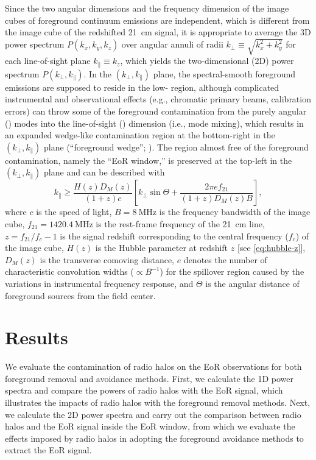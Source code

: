 \documentclass[twocolumn]{aastex62}
\newcommand{\klos}{\text{$k_{\parallel}$}}
\newcommand{\kperp}{\text{$k_{\bot}$}}
\begin{document}
Since the two angular dimensions and the frequency dimension of the image
cubes of foreground continuum emissions are independent, which is
different from the image cube of the redshifted 21~cm signal, it is
appropriate to average the 3D power spectrum $P(k_x, k_y, k_z)$
over angular annuli of radii $\kperp \equiv \sqrt{k_x^2 + k_y^2}$
for each line-of-sight plane $\klos \equiv k_z$, which yields the
two-dimensional (2D) power spectrum $P(\kperp, \klos)$.
In the $(\kperp, \klos)$ plane, the spectral-smooth foreground emissions
are supposed to reside in the low-\klos{} region, although complicated
instrumental and observational effects (e.g., chromatic primary beams,
calibration errors) can throw some of the foreground contamination from
the purely angular (\kperp) modes into the line-of-sight (\klos)
dimension (i.e., mode mixing), which results in an expanded wedge-like
contamination region at the bottom-right in the $(\kperp, \klos)$ plane
(\enquote{foreground wedge}; \citealt{datta2010,morales2012,liu2014}).
The region almost free of the foreground contamination, namely the
\enquote{EoR window,} is preserved at the top-left in the
$(\kperp, \klos)$ plane and can be described with \citep{thyagarajan2013}
\begin{equation}
  \label{eq:eor-window}
  \klos \geq \frac{H(z) D_{\!M}(z)}{(1+z) c} \left[
    \kperp \sin\Theta + \frac{2\pi e f_{21}}{(1+z) D_{\!M}(z) B} \right],
\end{equation}
where
$c$ is the speed of light,
$B = \SI{8}{\MHz}$ is the frequency bandwidth of the image cube,
$f_{21} = \SI{1420.4}{\MHz}$ is the rest-frame frequency of the 21~cm line,
$z = f_{21}/f_c - 1$ is the signal redshift corresponding to the central
frequency ($f_c$) of the image cube,
$H(z)$ is the Hubble parameter at redshift $z$ [see \autoref{eq:hubble-z}],
$D_{\!M}(z)$ is the transverse comoving distance,
$e$ denotes the number of characteristic convolution widths
($\propto B^{-1}$) for the spillover region caused by the variations in
instrumental frequency response,
and $\Theta$ is the angular distance of foreground sources from the
field center.


\section{Results}
\label{sec:results}

We evaluate the contamination of radio halos on the EoR observations for
both foreground removal and avoidance methods.
First, we calculate the 1D power spectra and compare the powers of
radio halos with the EoR signal, which illustrates the impacts of radio
halos with the foreground removal methods.
Next, we calculate the 2D power spectra and carry out the comparison
between radio halos and the EoR signal inside the EoR window, from
which we evaluate the effects imposed by radio halos in adopting the
foreground avoidance methods to extract the EoR signal.
\end{document}
